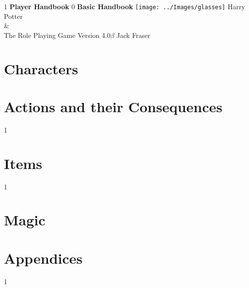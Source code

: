 \documentclass[oneside, twocolumn,9pt,english]{extbook}
\def\coreMode{1}
\newcommand*\cleartoleftpage{%
  \clearpage
  \ifodd\value{page}\hbox{}\clearpage\fi
}
\begin{document}
\begin{titlepage}
    \centering
    \vfill
    \if\coreMode1
    {\bfseries
        {\HP \fontsize{40}{35}\selectfont Player Handbook}
    }    
    \fi
    \if\coreMode0
    {\bfseries
        {\HP \fontsize{40}{35}\selectfont Basic Handbook}
    } 
    \fi
    \vfill
    \texttt{[image: ../Images/glasses]} %
    \vfill
    {\HP \fontsize{30}{24} \selectfont  Harry Potter \\\&\\ The Role Playing Game}
    \normalsize
    \vfill
    {\HP \fontsize{22}{0} \selectfont Version 4.0$\beta$ \hfill Jack Fraser}
\end{titlepage}

\setcounter{tocdepth}{0}  
\begin{spacing}{0.8}
\footnotesize
\tableofcontents
\normalsize
\end{spacing}


\cleartoleftpage
\part{Characters} \label{C:CharacterCreation}


%



\cleartoleftpage
\part{Actions and their Consequences}





\if\coreMode1	
	
\fi
\part{Items}


\if \coreMode1
	
\fi

\cleartoleftpage
\part{Magic}

\cleartoleftpage
\part{Appendices}
\if\coreMode1	
	
\fi
\cleartoleftpage

\end{document}
